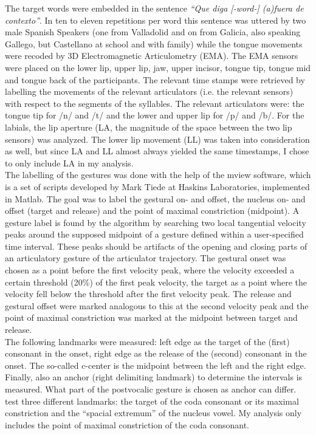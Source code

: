 \documentclass[../Proposal.tex]{subfiles}
\begin{document}
The target words were embedded in the sentence \textit{``Que diga [-word-] (a)fuera de contexto''}. In ten to eleven repetitions per word this sentence was uttered by two male Spanish Speakers (one from Valladolid and on from Galicia, also speaking Gallego, but Castellano at school and with family) while the tongue movements were recoded by 3D Electromagnetic Articulometry (EMA). The EMA sensors were placed on the lower lip, upper lip, jaw, upper incisor, tongue tip, tongue mid and tongue back of the participants.
The relevant time stamps were retrieved by labelling the movements of the relevant articulators (i.e. the relevant sensors) with respect to the segments of the syllables. The relevant articulators were: the tongue tip for /n/ and /t/ and the lower and upper lip for /p/ and /b/. For the labials, the lip aperture (LA, the magnitude of the space between the two lip sensors) was analyzed. The lower lip movement (LL) was taken into consideration as well, but since LA and LL almost always yielded the same timestamps, I chose to only include LA in my analysis.\\
The labelling of the gestures was done with the help of the mview software, which is a set of scripts developed by Mark Tiede at Haskins Laboratories, implemented in Matlab.
The goal was to label the gestural on- and offset, the nucleus on- and offset (target and release) and the point of maximal constriction (midpoint).
A gesture label is found by the algorithm by searching two local tangential velocity peaks around the supposed midpoint of a gesture defined within a user-specified time interval. These peaks should be artifacts of the opening and closing parts of an articulatory gesture of the articulator trajectory. The gestural onset was chosen as a point before the first velocity peak, where the velocity exceeded a certain threshold (20\%) of the first peak velocity, the target as a point where the velocity fell below the threshold after the first velocity peak. The release and gestural offset were marked analogous to this at the second velocity peak and the point of maximal constriction was marked at the midpoint between target and release.\\
The following landmarks were measured: left edge as the target of the (first) consonant in the onset, right edge as the release of the (second) consonant in the onset. The so-called c-center is the midpoint between the left and the right edge. Finally, also an anchor (right delimiting landmark) to determine the intervals is measured. What part of the postvocalic gesture is chosen as anchor can differ. \cite{sotiropoulou2020global} test three different landmarks: the target of the coda consonant or its maximal constriction and the ``spacial extremum'' of the nucleus vowel. My analysis only includes the point of maximal constriction of the coda consonant.\\
\end{document}
